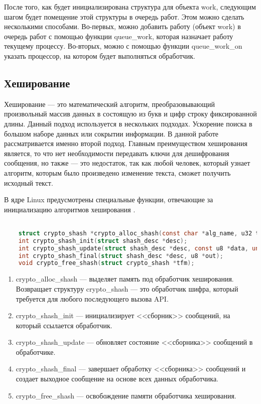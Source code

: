 После того, как будет инициализирована структура для объекта work, следующим шагом будет помещение этой структуры в очередь работ.
Этом можно сделать несколькими способами. 
Во-первых, можно добавить работу (объект work) в очередь работ с помощью функции queue\_work,
которая назначает работу текущему процессу.
Во-вторых, можно с помощью функции queue\_work\_on указать процессор, на котором будет выполняться обработчик.

\subsection{Хеширование}

Хеширование --- это математический алгоритм, преобразовывающий произвольный массив данных в состоящую из букв и цифр строку фиксированной длины.
Данный подход используется в нескольких подходах. 
Ускорение поиска в большом наборе данных или сокрытии информации.
В данной работе рассматривается именно второй подход.
Главным преимуществом хеширования является, то что нет необходимости передавать ключи для дешифрования сообщения,
но также --- это недостаток, так как любой человек, который узнает алгоритм, которым было произведено изменение текста, сможет получить исходный текст.

В ядре Linux предусмотрены специальные функции, отвечающие за инициализацию алгоритмов хеширования \cite{hasg}.

\begin{lstlisting}[language=c, label=cringe, caption=Функции алгоритмов хеширования.]

    struct crypto_shash *crypto_alloc_shash(const char *alg_name, u32 type, u32 mask);
    int crypto_shash_init(struct shash_desc *desc);
    int crypto_shash_update(struct shash_desc *desc, const u8 *data, unsigned int len);
    int crypto_shash_final(struct shash_desc *desc, u8 *out);
    void crypto_free_shash(struct crypto_shash *tfm);

\end{lstlisting}

\begin{enumerate}
    \item crypto\_alloc\_shash --- выделяет память под обработчик хеширования. 
    Возвращает структуру crypto\_shash --- это обработчик шифра, который требуется для любого последующего вызова API.
    \item crypto\_shash\_init --- инициализирует <<сборник>> сообщений, на который ссылается обработчик.
    \item crypto\_shash\_update --- обновляет состояние <<сборника>> сообщений в обработчике.
    \item crypto\_shash\_final --- завершает обработку <<сборника>> сообщений и создает выходное сообщение на основе всех данных обработчика.
    \item crypto\_free\_shash --- освобождение памяти обработчика хеширования.
\end{enumerate}

